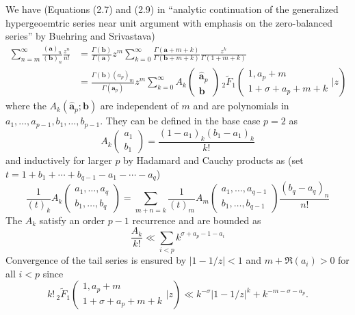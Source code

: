 \documentclass[12pt]{article}
\numberwithin{equation}{section}
\begin{document}
We have (Equations (2.7) and (2.9) in ``analytic continuation of the generalized hypergeoemtric series near unit argument with emphasis on the zero-balanced series'' by Buehring and Srivastava)
\begin{align}
\nonumber
\sum_{n=m}^{\infty}{\frac{(\mathbf{a})_n}{(\mathbf{b})_n} \frac{z^n}{n!}}&=\frac{\Gamma(\mathbf{b})}{\Gamma(\mathbf{a})} z^m \sum_{k=0}^{\infty} {\frac{\Gamma(\mathbf{a}+m+k)}{\Gamma(\mathbf{b}+m+k)} \frac{z^k}{\Gamma(1+m+k)}}\\
\label{buehring}
&=\frac{\Gamma(\mathbf{b})(a_p)_m}{\Gamma(\hat{\mathbf{a}}_p)} z^m \sum_{k=0}^{\infty} {A_k\left(\begin{array}{c} \hat{\mathbf{a}}_p \\ \mathbf{b} \end{array}\right)} \,{} _2\tilde{F}_1\left( \begin{array}{c} 1,a_p+m \\ 1+\sigma+a_p+m+k \end{array} \Big| z\right)
\end{align}
where the $A_k(\hat{\mathbf{a}}_p; \mathbf{b})$ are independent of $m$ and are polynomials in $a_1,\dots,a_{p-1},b_1,\dots,b_{p-1}$. They can be defined in the base case $p=2$ as
\begin{equation*}
A_k\left(\begin{array}{c} a_1 \\ b_1 \end{array}\right) = \frac{(1-a_1)_k(b_1-a_1)_k}{k!}
\end{equation*}
and inductively for larger $p$ by Hadamard and Cauchy products as (set $t=1+b_1 + \cdots + b_{q-1} - a_1-\cdots -a_q$)
\begin{equation*}
\frac{1}{(t)_k}A_k\left(\begin{array}{c}a_1,\dots,a_q\\b_1,\dots,b_q\end{array}\right) = \sum_{m+n=k} \frac{1}{(t)_m}A_m\left(\begin{array}{c}a_1,\dots,a_{q-1}\\b_1,\dots,b_{q-1}\end{array}\right) \frac{(b_q-a_q)_n}{n!}
\end{equation*}
The $A_k$ satisfy an order $p-1$ recurrence and are bounded as
\begin{equation}
\frac{A_k}{k!} \ll \sum_{i<p}k^{\sigma+a_p-1-a_i}
\end{equation}
Convergence of the tail series is ensured by
$|1-1/z|<1$ and $m+\Re(a_i)>0$ for all $i<p$ since
\begin{equation*}
k! \, _2\tilde{F}_1\left( \begin{array}{c} 1,a_p+m \\ 1+\sigma+a_p+m+k \end{array} \Big| z\right) \ll k^{-\sigma} \left|1-1/z\right|^k + k^{-m-\sigma-a_p}\text{.}
\end{equation*}
\end{document}
